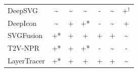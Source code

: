 \begin{table}[htbp]
\begin{tabularx}{\textwidth}{l c c c c c c}
\midrule
DeepSVG      & \textasciitilde & \textasciitilde & \textasciitilde  & - & \textasciitilde & +$^\dagger$ \\
DeepIcon     & \textasciitilde & +               & +*               & - & \textasciitilde & + \\
SVGFusion    & +*              & +               & +                & + & +               & \textasciitilde \\
T2V-NPR      & +*              & +               & +*               & - & \textasciitilde & - \\
LayerTracer  & +*              & +               & +                & + & +               & \textasciitilde \\
\bottomrule
\end{tabularx}
\end{table}